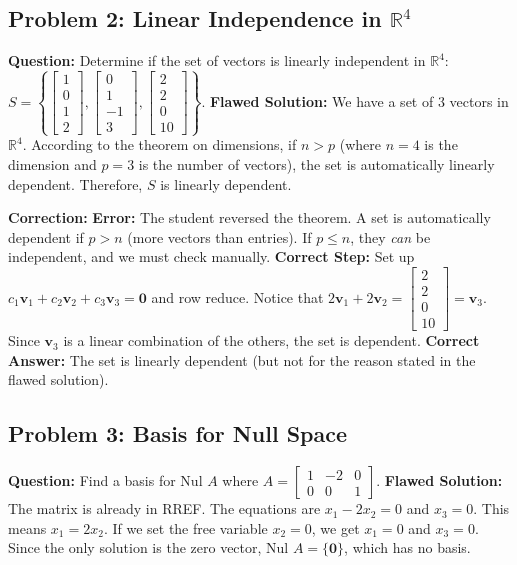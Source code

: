 \documentclass[12pt]{article}
\begin{document}
\subsection{Problem 2: Linear Independence in $\mathbb{R}^4$}
\textbf{Question:} Determine if the set of vectors is linearly independent in $\mathbb{R}^4$: 
$S = \left\{ \begin{bmatrix} 1 \\ 0 \\ 1 \\ 2 \end{bmatrix}, \begin{bmatrix} 0 \\ 1 \\ -1 \\ 3 \end{bmatrix}, \begin{bmatrix} 2 \\ 2 \\ 0 \\ 10 \end{bmatrix} \right\}$.
\textbf{Flawed Solution:}
We have a set of 3 vectors in $\mathbb{R}^4$. According to the theorem on dimensions, if $n > p$ (where $n=4$ is the dimension and $p=3$ is the number of vectors), the set is automatically linearly dependent. Therefore, $S$ is linearly dependent.

\textbf{Correction:}
\textbf{Error:} The student reversed the theorem. A set is automatically dependent if $p > n$ (more vectors than entries). If $p \leq n$, they \textit{can} be independent, and we must check manually.
\textbf{Correct Step:} Set up $c_1\mathbf{v}_1 + c_2\mathbf{v}_2 + c_3\mathbf{v}_3 = \mathbf{0}$ and row reduce. Notice that $2\mathbf{v}_1 + 2\mathbf{v}_2 = \begin{bmatrix} 2 \\ 2 \\ 0 \\ 10 \end{bmatrix} = \mathbf{v}_3$. Since $\mathbf{v}_3$ is a linear combination of the others, the set is dependent.
\textbf{Correct Answer:} The set is linearly dependent (but not for the reason stated in the flawed solution).

\subsection{Problem 3: Basis for Null Space}
\textbf{Question:} Find a basis for Nul $A$ where $A = \begin{bmatrix} 1 & -2 & 0 \\ 0 & 0 & 1 \end{bmatrix}$.
\textbf{Flawed Solution:}
The matrix is already in RREF. The equations are $x_1 - 2x_2 = 0$ and $x_3 = 0$.
This means $x_1 = 2x_2$. If we set the free variable $x_2 = 0$, we get $x_1 = 0$ and $x_3 = 0$.
Since the only solution is the zero vector, Nul $A = \{\mathbf{0}\}$, which has no basis.
\end{document}
